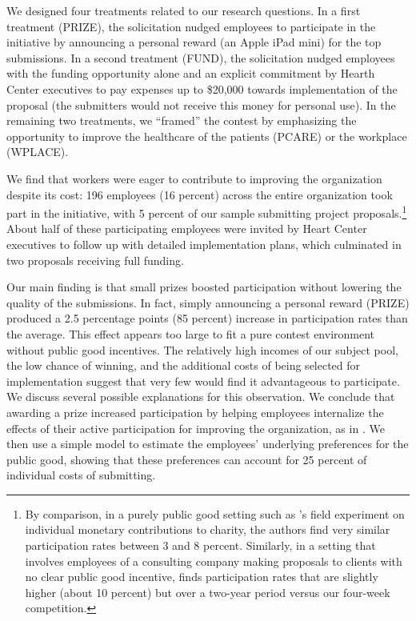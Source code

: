 \documentclass[11pt, titlepage]{article}
\begin{document}
We designed four treatments related to our research questions. In a
first treatment (PRIZE), the solicitation nudged employees to
participate in the initiative by announcing a personal reward (an Apple
iPad mini) for the top submissions. In a second treatment (FUND), the
solicitation nudged employees with the funding opportunity alone and an
explicit commitment by Hearth Center executives to pay expenses up to
\$20,000 towards implementation of the proposal (the submitters would
not receive this money for personal use). In the remaining two
treatments, we ``framed'' the contest by emphasizing the opportunity to
improve the healthcare of the patients (PCARE) or the workplace
(WPLACE).

We find that workers were eager to contribute to improving the
organization despite its cost: 196 employees (16 percent) across the
entire organization took part in the initiative, with 5 percent of our
sample submitting project proposals.\footnote{By comparison, in a purely
  public good setting such as \citet{list2002effects}'s field experiment
  on individual monetary contributions to charity, the authors find very
  similar participation rates between 3 and 8 percent. Similarly, in a
  setting that involves employees of a consulting company making
  proposals to clients with no clear public good incentive,
  \citet{gibbs2014field} finds participation rates that are slightly
  higher (about 10 percent) but over a two-year period versus our
  four-week competition.} About half of these participating employees
were invited by Heart Center executives to follow up with detailed
implementation plans, which culminated in two proposals receiving full
funding.

Our main finding is that small prizes boosted participation without
lowering the quality of the submissions. In fact, simply announcing a
personal reward (PRIZE) produced a 2.5 percentage points (85 percent)
increase in participation rates than the average. This effect appears
too large to fit a pure contest environment without public good
incentives. The relatively high incomes of our subject pool, the low
chance of winning, and the additional costs of being selected for
implementation suggest that very few would find it advantageous to
participate. We discuss several possible explanations for this
observation. We conclude that awarding a prize increased participation
by helping employees internalize the effects of their active
participation for improving the organization, as in
\citet{morgan2000financing}. We then use a simple model to estimate the
employees' underlying preferences for the public good, showing that
these preferences can account for 25 percent of individual costs of
submitting.
\end{document}
